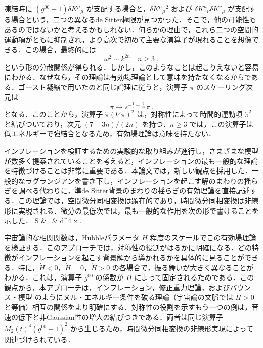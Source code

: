 凍結時に $(g^{00}+1)\delta K^\mu {}_\mu $ が支配する場合と，$\delta K^\mu {}_\mu {}^2$ および $\delta K^\mu {}_\nu \delta K^\nu
{}_\mu$ が支配する場合という，二つの異なるde Sitter極限が見つかった．そこで，他の可能性もあるのではないかと考えるかもしれない．何らかの理由で，これら二つの空間的運動項がともに抑制され，より高次で初めて主要な演算子が現れることを想像できる．この場合，最終的には
\begin{equation}
\omega^2\sim k^{2n} \quad n \geq 3 \;.
\end{equation}
という形の分散関係が得られる．しかし，このようなことは起こりえないと容易にわかる．なぜなら，その理論は有効場理論として意味を持たなくなるからである．ゴースト凝縮で用いたのと同じ論理に従うと，演算子 $\pi$ のスケーリング次元は
\begin{equation}
\pi\rightarrow s^{-\frac12+\frac{3}{2n}} \pi \, .
\end{equation}
となる．このことから，演算子 $\dot\pi(\nabla\pi)^2$ は，対称性によって時間的運動項 $\dot\pi^2$ と結びついており，次元
$(7-3n)/(2n)$ を持つ．$n \geq 3$ では，この演算子は低エネルギーで強結合となるため，有効場理論は意味を持たない．

インフレーションを検証するための実験的な取り組みが進行し，さまざまな模型が数多く提案されていることを考えると，インフレーションの最も一般的な理論を特徴づけることは非常に重要である．本論文では，新しい観点を採用した．一般的なラグランジアンを書き下し，インフレーションを起こす解のまわりの揺らぎを調べる代わりに，準de Sitter背景のまわりの揺らぎの有効理論を直接記述する．この理論では，空間微分同相変換は顕在的であり，時間微分同相変換は非線形に実現される．微分の最低次では，最も一般的な作用を次の形で書けることを示した．
\be
S &=& \int  \! d^4 x \;   \; .
\ee

宇宙論的な相関関数は，Hubbleパラメータ $H$ 程度のスケールでこの有効場理論を検証する．このアプローチでは，対称性の役割がはるかに明確になる．どの特徴がインフレーションを起こす背景解から導かれるかを具体的に見ることができる．特に，$\dot H<0$，$\dot H = 0$，$\dot H > 0$ の各場合で，振る舞いが大きく異なることがわかる．これは，演算子 $g^{00}$ の係数が $\dot H$ によって固定されるためである．この観点から，本アプローチは，インフレーション，修正重力理論，およびバウンス・模型 \cite{Creminelli:2006xe,Buchbinder:2007ad,Creminelli:2007aq} のようにヌル・エネルギー条件を破る理論（宇宙論の文脈では $\dot H >0$ と等価）相互の関係をより明確にする．対称性の役割を示すもう一つの例は，音速の低下と非Gaussian性の増大の結びつきである．両者は同じ演算子 $M_2(t)^4(g^{00}+1)^2$ から生じるため，時間微分同相変換の非線形実現によって関連づけられている．

